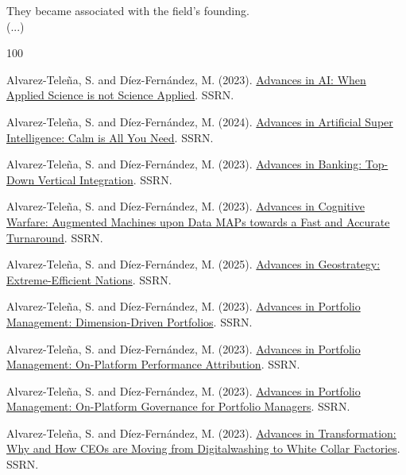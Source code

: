 \documentclass{article}
\begin{document}
They became associated with the field's founding.\\
(...)\\


















\begin{thebibliography}{100}

 Alvarez-Teleña, S. and Díez-Fernández, M. (2023). \href{https://papers.ssrn.com/sol3/papers.cfm?abstract_id=4445463}{Advances in AI: When Applied Science is not Science Applied}. SSRN.

 Alvarez-Teleña, S. and Díez-Fernández, M. (2024). \href{https://ssrn.com/abstract=4924496}{Advances in Artificial Super Intelligence: Calm is All You Need}. SSRN.

 Alvarez-Teleña, S. and Díez-Fernández, M. (2023). \href{https://ssrn.com/abstract=4430206}{Advances in Banking: Top-Down Vertical Integration}. SSRN.

 Alvarez-Teleña, S. and Díez-Fernández, M. (2023). \href{https://ssrn.com/abstract=4321573}{Advances in Cognitive Warfare: Augmented Machines upon Data MAPs towards a Fast and Accurate Turnaround}. SSRN.

 Alvarez-Teleña, S. and Díez-Fernández, M. (2025). \href{https://ssrn.com/abstract=5136657}{Advances in Geostrategy: Extreme-Efficient Nations}. SSRN.

  Alvarez-Teleña, S. and Díez-Fernández, M. (2023). \href{https://ssrn.com/abstract=4321538}{Advances in Portfolio Management: Dimension-Driven Portfolios}. SSRN.
 
  Alvarez-Teleña, S. and Díez-Fernández, M. (2023). \href{https://ssrn.com/abstract=4321552}{Advances in Portfolio Management: On-Platform Performance Attribution}. SSRN.
 
  Alvarez-Teleña, S. and Díez-Fernández, M. (2023). \href{https://ssrn.com/abstract=4321554}{Advances in Portfolio Management: On-Platform Governance for Portfolio Managers}. SSRN.

 Alvarez-Teleña, S. and Díez-Fernández, M. (2023). \href{https://ssrn.com/abstract=4560804}{Advances in Transformation: Why and How CEOs are Moving from Digitalwashing to White Collar Factories}. SSRN.


\end{thebibliography}
\end{document}

